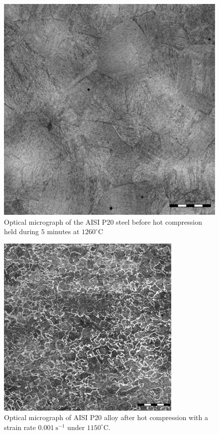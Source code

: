 \documentclass[twoside,english,1p,final,sort&compress]{elsarticle}
\theoremstyle{plain}
\begin{document}
\begin{figure}[!ht]
\centering
\includegraphics[width=0.9\columnwidth]
{Figures/BeforeCompM}
\caption{Optical micrograph of the AISI P20 steel before hot compression held during $5$ minutes at $1260^\circ$C}
\label{fig:BeforeCompM}
\end{figure}
\begin{figure}[!ht]
\centering
\includegraphics[width=0.9\columnwidth]
{Figures/AfterCompM}
\caption{Optical micrograph of AISI P20 alloy after hot compression with a strain rate $0.001\ \text{s}^{-1}$ under $1150^\circ$C.}
\label{fig:AfterCompM}
\end{figure}
\end{document}
